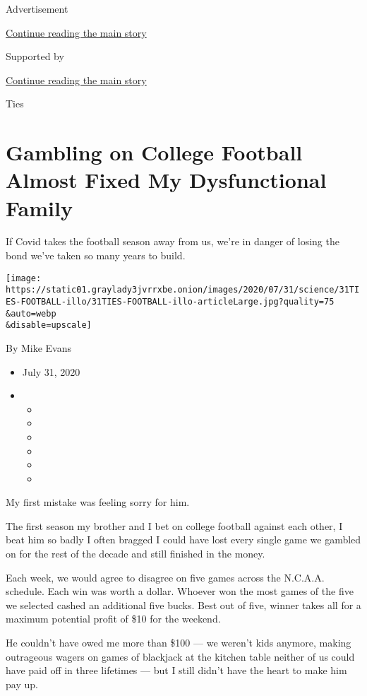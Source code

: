Advertisement

\protect\hyperlink{after-top}{Continue reading the main story}

Supported by

\protect\hyperlink{after-sponsor}{Continue reading the main story}

Ties

\hypertarget{gambling-on-college-football-almost-fixed-my-dysfunctional-family}{%
\section{Gambling on College Football Almost Fixed My Dysfunctional
Family}\label{gambling-on-college-football-almost-fixed-my-dysfunctional-family}}

If Covid takes the football season away from us, we're in danger of
losing the bond we've taken so many years to build.

\texttt{[image: https://static01.graylady3jvrrxbe.onion/images/2020/07/31/science/31TIES-FOOTBALL-illo/31TIES-FOOTBALL-illo-articleLarge.jpg?quality=75\\\&auto=webp\\\&disable=upscale]}

By Mike Evans

\begin{itemize}
\item
  July 31, 2020
\item
  \begin{itemize}
  \item
  \item
  \item
  \item
  \item
  \item
  \end{itemize}
\end{itemize}

My first mistake was feeling sorry for him.

The first season my brother and I bet on college football against each
other, I beat him so badly I often bragged I could have lost every
single game we gambled on for the rest of the decade and still finished
in the money.

Each week, we would agree to disagree on five games across the N.C.A.A.
schedule. Each win was worth a dollar. Whoever won the most games of the
five we selected cashed an additional five bucks. Best out of five,
winner takes all for a maximum potential profit of \$10 for the weekend.

He couldn't have owed me more than \$100 --- we weren't kids anymore,
making outrageous wagers on games of blackjack at the kitchen table
neither of us could have paid off in three lifetimes --- but I still
didn't have the heart to make him pay up.

